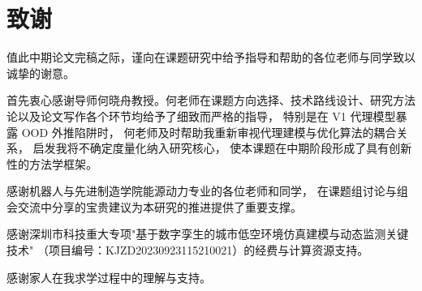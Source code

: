 
\chapter*{致谢}


值此中期论文完稿之际，谨向在课题研究中给予指导和帮助的各位老师与同学致以诚挚的谢意。

首先衷心感谢导师何晓舟教授。何老师在课题方向选择、技术路线设计、研究方法论以及论文写作各个环节均给予了细致而严格的指导，
特别是在 V1 代理模型暴露 OOD 外推陷阱时，
何老师及时帮助我重新审视代理建模与优化算法的耦合关系，
启发我将不确定度量化纳入研究核心，
使本课题在中期阶段形成了具有创新性的方法学框架。

感谢机器人与先进制造学院能源动力专业的各位老师和同学，
在课题组讨论与组会交流中分享的宝贵建议为本研究的推进提供了重要支撑。

感谢深圳市科技重大专项"基于数字孪生的城市低空环境仿真建模与动态监测关键技术"
（项目编号：KJZD20230923115210021）的经费与计算资源支持。

感谢家人在我求学过程中的理解与支持。
